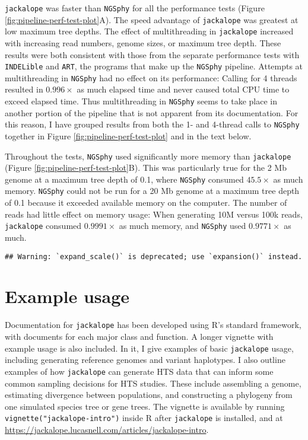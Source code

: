 \documentclass[12pt,]{article}
\begin{document}
\texttt{jackalope} was faster than \texttt{NGSphy} for all the performance tests
(Figure \ref{fig:pipeline-perf-test-plot}A).
The speed advantage of \texttt{jackalope} was greatest at low maximum tree depths.
The effect of multithreading in \texttt{jackalope} increased with increasing read numbers,
genome sizes, or maximum tree depth.
These results were both consistent with those from the separate performance tests with
\texttt{INDELible} and \texttt{ART}, the programs that make up the \texttt{NGSphy} pipeline.
Attempts at multithreading in \texttt{NGSphy} had no effect on its performance:
Calling for 4 threads resulted in \(0.996 \times\)
as much elapsed time and never caused total CPU time to exceed elapsed time.
Thus multithreading in \texttt{NGSphy} seems to take place in another portion of the pipeline
that is not apparent from its documentation.
For this reason, I have grouped results from both the 1- and 4-thread calls to \texttt{NGSphy}
together in Figure \ref{fig:pipeline-perf-test-plot} and in the text below.

Throughout the tests, \texttt{NGSphy} used significantly more memory than \texttt{jackalope}
(Figure \ref{fig:pipeline-perf-test-plot}B).
This was particularly true for the 2 Mb genome at a maximum tree depth of 0.1,
where \texttt{NGSphy} consumed
\(45.5 \times\)
as much memory.
\texttt{NGSphy} could not be run for a 20 Mb genome at a maximum tree depth of 0.1 because
it exceeded available memory on the computer.
The number of reads had little effect on memory usage: When generating 10M versus
100k reads, \texttt{jackalope} consumed \(0.9991 \times\)
as much memory, and \texttt{NGSphy} used \(0.9771 \times\)
as much.

\begin{verbatim}
## Warning: `expand_scale()` is deprecated; use `expansion()` instead.
\end{verbatim}

\hypertarget{example-usage}{%
\section{Example usage}\label{example-usage}}

Documentation for \texttt{jackalope} has been developed using R's standard framework, with
documents for each major class and function.
A longer vignette with example usage is also included.
In it, I give examples of basic \texttt{jackalope} usage, including generating reference genomes
and variant haplotypes.
I also outline examples of how \texttt{jackalope} can generate HTS data that can inform
some common sampling decisions for HTS studies.
These include assembling a genome, estimating divergence between populations,
and constructing a phylogeny from one simulated species tree or gene trees.
The vignette is available
by running \texttt{vignette("jackalope-intro")} inside R after \texttt{jackalope} is installed,
and at
\url{https://jackalope.lucasnell.com/articles/jackalope-intro}.
\end{document}
